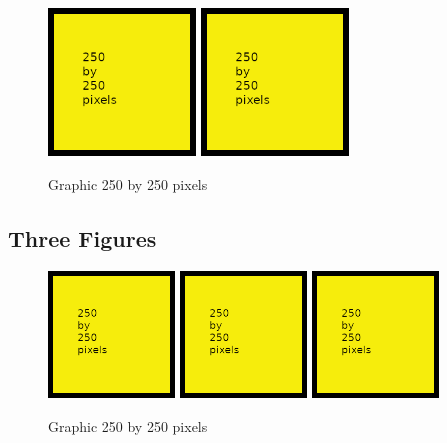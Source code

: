 \begin{figure}[H]
\centering
\includegraphics[width=0.35\textwidth]{250x250}
\includegraphics[width=0.35\textwidth]{250x250}
\caption{Graphic 250 by 250 pixels}\label{fg:250x250-3}
\end{figure}

\subsection*{Three Figures}

\begin{figure}[H]
\centering
\includegraphics[width=0.3\textwidth]{250x250}
\includegraphics[width=0.3\textwidth]{250x250}
\includegraphics[width=0.3\textwidth]{250x250}
\caption{Graphic 250 by 250 pixels}\label{fg:250x250-4}
\end{figure}

